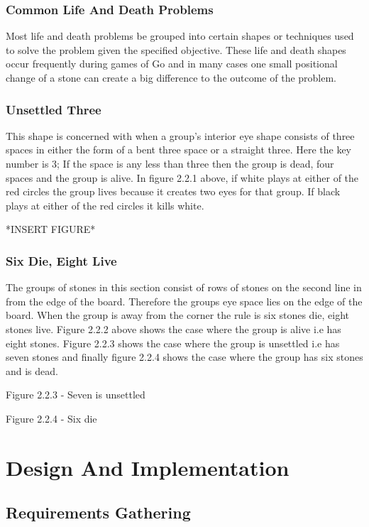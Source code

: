 \documentclass{l3proj}
\begin{document}
\subsection{Common Life And Death Problems}

Most life and death problems be grouped into certain shapes or techniques used to solve the problem given the specified objective. These life and death shapes occur frequently during games of Go and in many cases one small positional change of a stone can create a big difference to the outcome of the problem.

\subsection{Unsettled Three}

This shape is concerned with when a group’s interior eye shape consists of three spaces in either the form of a bent three space or a straight three. Here the key number is 3; If the space is any less than three then the group is dead, four spaces and the group is alive. In figure 2.2.1 above, if white plays at either of the red circles the group lives because it creates two eyes for that group. If black plays at either of the red circles it kills white.

*INSERT FIGURE*

\subsection{Six Die, Eight Live}

The groups of stones in this section consist of rows of stones on the second line in from the edge of the board.  Therefore the groups eye space lies on the edge of the board. When the group is away from the corner the rule is six stones die, eight stones live. Figure 2.2.2 above shows the case where the group is alive i.e has eight stones. Figure 2.2.3 shows the case where the group is unsettled i.e has seven stones and finally figure 2.2.4 shows the case where the group has six stones and is dead.

Figure 2.2.3 - Seven is unsettled

Figure 2.2.4 - Six die

\chapter{Design And Implementation}
\label{design}

\section{Requirements Gathering}
\end{document}
